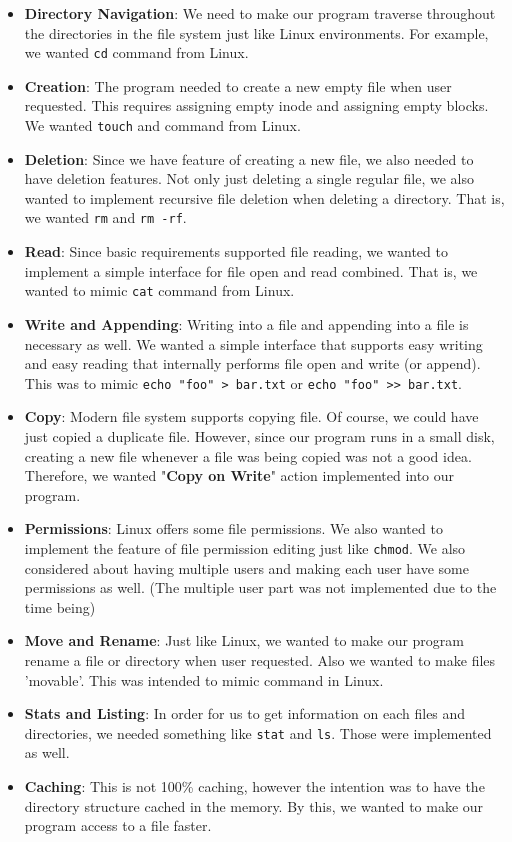 \documentclass{homework}
\begin{document}
\begin{itemize}
    \item \textbf{Directory Navigation}: We need to make our program traverse throughout the directories in the file system just like Linux environments. For example, we wanted \texttt{cd} command from Linux.
    \item \textbf{Creation}: The program needed to create a new empty file when user requested. This requires assigning empty inode and assigning empty blocks. We wanted \texttt{touch} and  command from Linux.
    \item \textbf{Deletion}: Since we have feature of creating a new file, we also needed to have deletion features. Not only just deleting a single regular file, we also wanted to implement recursive file deletion when deleting a directory. That is, we wanted \texttt{rm} and \texttt{rm -rf}.
    \item \textbf{Read}: Since basic requirements supported file reading, we wanted to implement a simple interface for file open and read combined. That is, we wanted to mimic \texttt{cat} command from Linux.
    \item \textbf{Write and Appending}: Writing into a file and appending into a file is necessary as well. We wanted a simple interface that supports easy writing and easy reading that internally performs file open and write (or append). This was to mimic \texttt{echo "foo" > bar.txt} or \texttt{echo "foo" >> bar.txt}. 
    \item \textbf{Copy}: Modern file system supports copying file. Of course, we could have just copied a duplicate file. However, since our program runs in a small disk, creating a new file whenever a file was being copied was not a good idea. Therefore, we wanted "\textbf{Copy on Write}" action implemented into our program.
    \item \textbf{Permissions}: Linux offers some file permissions. We also wanted to implement the feature of file permission editing just like \texttt{chmod}. We also considered about having multiple users and making each user have some permissions as well. (The multiple user part was not implemented due to the time being)
    \item \textbf{Move and Rename}: Just like Linux, we wanted to make our program rename a file or directory when user requested. Also we wanted to make files 'movable'. This was intended to mimic  command in Linux.
    \item \textbf{Stats and Listing}: In order for us to get information on each files and directories, we needed something like \texttt{stat} and \texttt{ls}. Those were implemented as well.
    \item \textbf{Caching}: This is not 100\% caching, however the intention was to have the directory structure cached in the memory. By this, we wanted to make our program access to a file faster.
\end{itemize}
\end{document}
